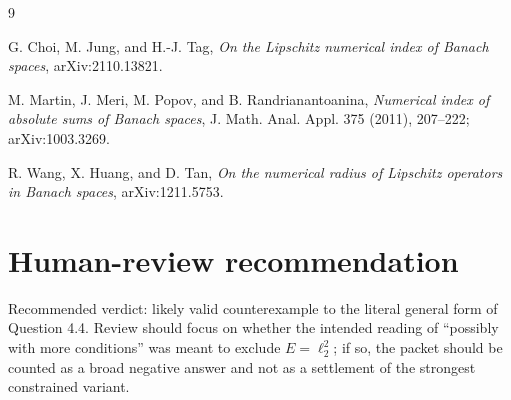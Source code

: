 \documentclass[11pt]{article}
\begin{document}
\begin{thebibliography}{9}

G. Choi, M. Jung, and H.-J. Tag,
\emph{On the Lipschitz numerical index of Banach spaces},
arXiv:2110.13821.

M. Martin, J. Meri, M. Popov, and B. Randrianantoanina,
\emph{Numerical index of absolute sums of Banach spaces},
J. Math. Anal. Appl. 375 (2011), 207--222; arXiv:1003.3269.

R. Wang, X. Huang, and D. Tan,
\emph{On the numerical radius of Lipschitz operators in Banach spaces},
arXiv:1211.5753.

\end{thebibliography}

\section*{Human-review recommendation}

Recommended verdict: likely valid counterexample to the literal general form of Question 4.4.  Review should focus on whether the intended reading of ``possibly with more conditions'' was meant to exclude \(E=\ell_2^2\); if so, the packet should be counted as a broad negative answer and not as a settlement of the strongest constrained variant.
\end{document}
